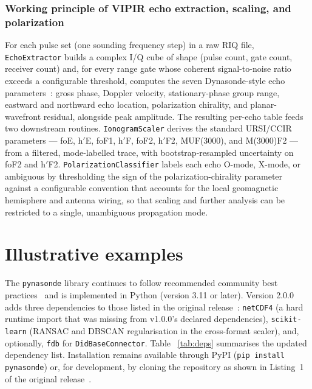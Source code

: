 \documentclass[12pt,a4paper]{article}
\begin{document}
\subsubsection{Working principle of VIPIR echo extraction, scaling, and polarization}

For each pulse set (one sounding frequency step) in a raw RIQ file,
\texttt{EchoExtractor} builds a complex I/Q cube of shape (pulse count, gate
count, receiver count) and, for every range gate whose coherent
signal-to-noise ratio exceeds a configurable threshold, computes the seven
Dynasonde-style echo parameters~\cite{Zabotin2005}: gross phase, Doppler
velocity, stationary-phase group range, eastward and northward echo
location, polarization chirality, and planar-wavefront residual, alongside
peak amplitude. The resulting per-echo table feeds two downstream routines.
\texttt{IonogramScaler} derives the standard URSI/CCIR parameters --- foE,
h$'$E, foF1, h$'$F, foF2, h$'$F2, MUF(3000), and M(3000)F2 --- from a
filtered, mode-labelled trace, with bootstrap-resampled uncertainty on foF2
and h$'$F2. \texttt{PolarizationClassifier} labels each echo O-mode, X-mode,
or ambiguous by thresholding the sign of the polarization-chirality
parameter against a configurable convention that accounts for the local
geomagnetic hemisphere and antenna wiring, so that scaling and further
analysis can be restricted to a single, unambiguous propagation mode.

\section{Illustrative examples}
\label{sec:examples}

The \texttt{pynasonde} library continues to follow recommended community best
practices~\cite{Burrell2018} and is implemented in Python (version 3.11 or
later). Version 2.0.0 adds three dependencies to those listed in the
original release~\cite{Chakraborty2026}: \texttt{netCDF4} (a hard runtime
import that was missing from v1.0.0's declared dependencies),
\texttt{scikit-learn} (RANSAC and DBSCAN regularisation in the cross-format
scaler), and, optionally, \texttt{fdb} for \texttt{DidBaseConnector}. Table~
\ref{tab:deps} summarises the updated dependency list. Installation remains
available through PyPI (\texttt{pip install pynasonde}) or, for development,
by cloning the repository as shown in Listing~1 of the original
release~\cite{Chakraborty2026}.
\end{document}
